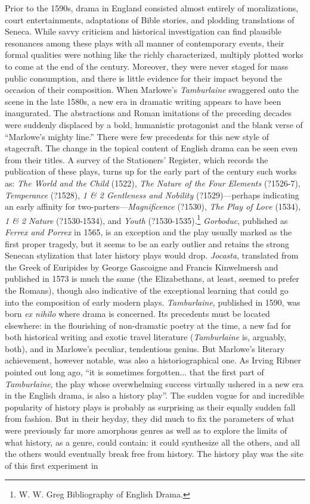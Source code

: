 Prior to the 1590s, drama in England consisted almost entirely of moralizations, court entertainments, adaptations of Bible stories, and plodding translations of Seneca. While savvy criticism and historical investigation can find plausible resonances among these plays with all manner of contemporary events, their formal qualities were nothing like the richly characterized, multiply plotted works to come at the end of the century. Moreover, they were never staged for mass public consumption, and there is little evidence for their impact beyond the occasion of their composition. When Marlowe's \emph{Tamburlaine} swaggered onto the scene in the late 1580s, a new era in dramatic writing appears to have been inaugurated. The abstractions and Roman imitations of the preceding decades were suddenly displaced by a bold, humanistic protagonist and the blank verse of ``Marlowe's mighty line.'' There were few precedents for this new style of stagecraft. The change in the topical content of English drama can be seen even from their titles. A survey of the Stationers' Register, which records the publication of these plays, turns up for the early part of the century such works as: \emph{The World and the Child} (1522), \emph{The Nature of the Four Elements} (?1526-7), \emph{Temperance} (?1528), \emph{1 \& 2 Gentleness and Nobility} (?1529)---perhaps indicating an early affinity for two-parters---\emph{Magnificence} (?1530), \emph{The Play of Love} (1534), \emph{1 \& 2 Nature} (?1530-1534), and \emph{Youth} (?1530-1535).\footnote{W. W. Greg Bibliography of English Drama.\nocite{greg_bibliography_1939}} \emph{Gorboduc}, published as \emph{Ferrex and Porrex} in 1565, is an exception and the play usually marked as the first proper tragedy, but it seems to be an early outlier and retains the strong Senecan stylization that later history plays would drop. \emph{Jocasta}, translated from the Greek of Euripides by George Gascoigne and Francis Kinwelmersh and published in 1573 is much the same (the Elizabethans, at least, seemed to prefer the Romans), though also indicative of the exceptional learning that could go into the composition of early modern plays. \emph{Tamburlaine}, published in 1590, was born \emph{ex nihilo} where drama is concerned. Its precedents must be located elsewhere: in the flourishing of non-dramatic poetry at the time, a new fad for both historical writing and exotic travel literature (\emph{Tamburlaine} is, arguably, both), and in Marlowe's peculiar, tendentious genius. But Marlowe's literary achievement, however notable, was also a historiographical one. As Irving Ribner pointed out long ago, ``it is sometimes forgotten... that the first part of \emph{Tamburlaine}, the play whose overwhelming success virtually ushered in a new era in the English drama, is also a history play''\cite[251]{ribner_idea_1953}. The sudden vogue for and incredible popularity of history plays is probably as surprising as their equally sudden fall from fashion. But in their heyday, they did much to fix the parameters of what were previously far more amorphous genres as well as to explore the limits of what history, as a genre, could contain: it could synthesize all the others, and all the others would eventually break free from history. The history play was the site of this first experiment in 